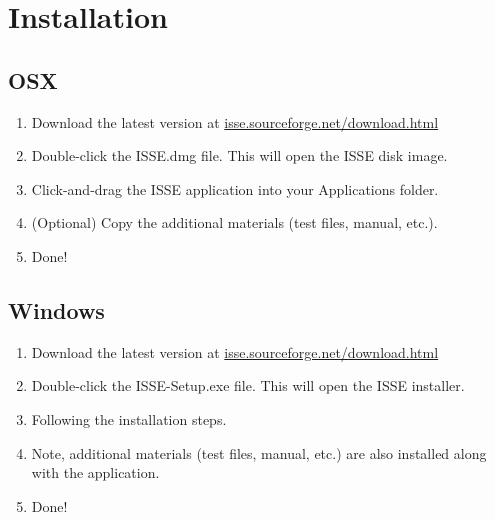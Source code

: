 \documentclass[11pt]{article}
\begin{document}
\section{Installation}

\subsection{OSX}
\begin{enumerate}
\item Download the latest version at  \textcolor{blue}{\href{http://isse.sourceforge.net/download.html}{isse.sourceforge.net/download.html}}
\item Double-click the ISSE.dmg file. This will open the ISSE disk image.
\item Click-and-drag the ISSE application into your Applications folder.
\item (Optional) Copy the additional materials (test files, manual, etc.).
\item Done!  
\end{enumerate}

\subsection{Windows}
\begin{enumerate}
\item Download the latest version at  \textcolor{blue}{\href{http://isse.sourceforge.net/download.html}{isse.sourceforge.net/download.html}}
\item Double-click the ISSE-Setup.exe file. This will open the ISSE installer.
\item Following the installation steps.
\item Note, additional materials (test files, manual, etc.) are also installed along with the application.
\item Done!  
\end{enumerate}

\end{document}
